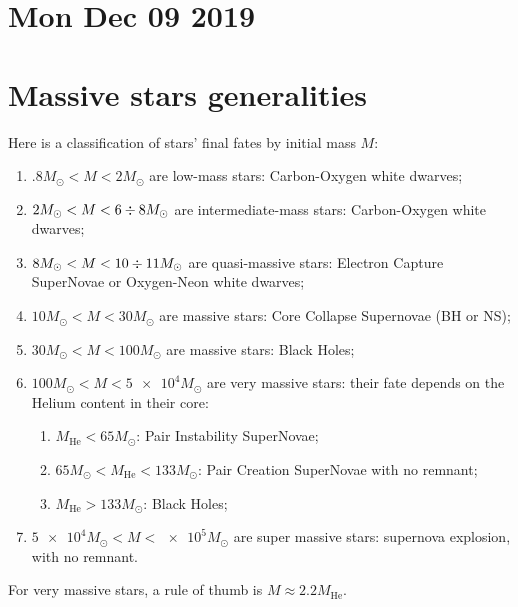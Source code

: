 \documentclass[main.tex]{subfiles}
\begin{document}
\section*{Mon Dec 09 2019}

\section{Massive stars generalities}


Here is a classification of stars' final fates by initial mass \(M\): 
\begin{enumerate}
    \item \(\num{.8} M_{\odot} < M < \num{2} M_{\odot}\) are low-mass stars: Carbon-Oxygen white dwarves;
    \item \(\num{2} M_{\odot} < M < 6 \divisionsymbol 8 M_{\odot}\) are intermediate-mass stars: Carbon-Oxygen white dwarves;
    \item \(\num{8} M_{\odot} < M < 10 \divisionsymbol 11 M_{\odot}\) are quasi-massive stars: Electron Capture SuperNovae or Oxygen-Neon white dwarves;
    \item \(10 M_{\odot} < M < 30 M_{\odot}\) are massive stars: Core Collapse Supernovae (BH or NS);
    \item \(30 M_{\odot} < M < 100 M_{\odot}\) are massive stars: Black Holes;
    \item \(100 M_{\odot} < M < \num{5e4} M_{\odot}\) are very massive stars: their fate depends on the Helium content in their core: \begin{enumerate}
        \item \(M _{\text{He}} < 65 M_{\odot}\): Pair Instability SuperNovae;
        \item \(65 M_{\odot} < M _{\text{He}} < 133 M_{\odot}\): Pair Creation SuperNovae with no remnant;
        \item \(M _{\text{He}} > 133 M_{\odot}\): Black Holes;
    \end{enumerate}
    \item \(\num{5e4} M_{\odot} < M < \num{e5} M_{\odot}\)  are super massive stars: supernova explosion, with no remnant.
\end{enumerate}

For very massive stars, a rule of thumb is \(M \approx 2.2 M _{\text{He}} \).

\end{document}
